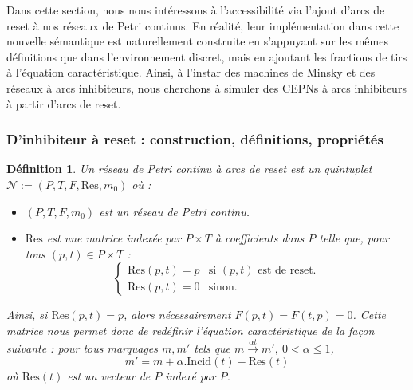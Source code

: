 \documentclass{article}
\newtheorem{definition}{Définition}
\theoremstyle{remark}
\theoremstyle{remark}
\newcommand{\reaches}[1][]{\xrightarrow{#1}}
\newcommand{\incid}{\mathrm{Incid}}
\newcommand{\reset}{\mathrm{Res}}
\begin{document}
Dans cette section, nous nous intéressons à l'accessibilité via l'ajout d'arcs de reset à nos réseaux de Petri continus. En réalité, leur implémentation dans cette nouvelle sémantique est naturellement construite en s'appuyant sur les mêmes définitions que dans l'environnement discret, mais en ajoutant les fractions de tirs à l'équation caractéristique. Ainsi, à l'instar des machines de Minsky et des réseaux à arcs inhibiteurs, nous cherchons à simuler des CEPNs à arcs inhibiteurs à partir d'arcs de reset.

\subsubsection{D'inhibiteur à reset : construction, définitions, propriétés}

\begin{definition}
    Un réseau de Petri continu à arcs de reset est un quintuplet $\mathcal{N} := (P, T, F, \reset, m_0)$ où : \begin{itemize}
        \item $(P, T, F, m_0)$ est un réseau de Petri continu.
        \item $\reset$ est une matrice indexée par $P \times T$ à coefficients dans $P$ telle que, pour tous $(p, t) \in  P \times T$ : \[\begin{cases}
            \reset(p, t) = p & \text{si } (p, t) \text{ est de reset.} \\
            \reset(p, t) = 0 & \text{sinon.}
        \end{cases}\]
    \end{itemize}
    Ainsi, si $\reset(p, t) = p$, alors nécessairement $F(p, t) = F(t, p) = 0$. Cette matrice nous permet donc de redéfinir l'équation caractéristique de la façon suivante : pour tous marquages $m, m'$ tels que $m \reaches[\alpha t] m',\ 0 < \alpha \leq 1$, \[m' = m + \alpha.\incid(t) - \reset(t)\] où $\reset(t)$ est un vecteur de $P$ indexé par $P$.
\end{definition}
\end{document}
